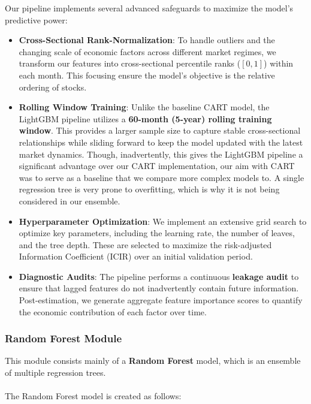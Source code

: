 \documentclass[11pt]{article}
\begin{document}
\begin{itemize}
    Our pipeline implements several advanced safeguards to maximize the model's predictive power:
    \begin{itemize}
        \item \textbf{Cross-Sectional Rank-Normalization}: To handle outliers and the changing scale of economic factors across different market regimes, we transform our features into cross-sectional percentile ranks ($[0,1]$) within each month. This focusing ensure the model's objective is the relative ordering of stocks.
        \item \textbf{Rolling Window Training}: Unlike the baseline CART model, the LightGBM pipeline utilizes a \textbf{60-month (5-year) rolling training window}. This provides a larger sample size to capture stable cross-sectional relationships while sliding forward to keep the model updated with the latest market dynamics. Though, inadvertently, this gives the LightGBM pipeline a significant advantage over our CART implementation, our aim with CART was to serve as a baseline that we compare more complex models to. A single regression tree is very prone to overfitting, which is why it is not being considered in our ensemble.
        \item \textbf{Hyperparameter Optimization}: We implement an extensive grid search to optimize key parameters, including the learning rate, the number of leaves, and the tree depth. These are selected to maximize the risk-adjusted Information Coefficient (ICIR) over an initial validation period.
        \item \textbf{Diagnostic Audits}: The pipeline performs a continuous \textbf{leakage audit} to ensure that lagged features do not inadvertently contain future information. Post-estimation, we generate aggregate feature importance scores to quantify the economic contribution of each factor over time.
    \end{itemize}
\end{itemize}
\subsubsection{Random Forest Module}
This module consists mainly of a \textbf{Random Forest} model, which is an ensemble of multiple regression trees.
\\
\\
The Random Forest model is created as follows:
\end{document}
